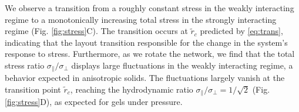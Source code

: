 \documentclass[nofootinbib,preprint,floatfix,titlepage,endfloats,superscriptaddress]{revtex4} %
\begin{document}
We observe a transition from a roughly constant stress in the weakly interacting regime to a monotonically increasing total stress in the strongly interacting regime (Fig. \ref{fig:stress}C). 
The transition occurs at $\tilde{r}_c$ predicted by \eqref{eq:trans}, indicating that the layout transition responsible for the change in the system's response to stress.  
Furthermore, as we rotate the network, we
find that the total stress ratio $ \sigma_\parallel/ \sigma_\perp$ displays large fluctuations in the weakly interacting regime, a behavior expected in anisotropic solids. 
The fluctuations largely vanish at the transition point $\tilde{r}_c$, reaching the hydrodynamic ratio $\sigma_\parallel/\sigma_\perp = 1/\sqrt{2}$  (Fig. \ref{fig:stress}D), as expected for gels under pressure. 
  
\begin{figure}
    \centering
    \vspace{-2cm}

\end{figure}
\end{document}
